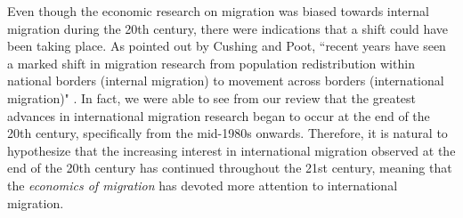 Even though the economic research on migration was biased towards internal migration during the 20th century, there were indications that a shift could have been taking place. As pointed out by Cushing and Poot, ``recent years have seen a marked shift in migration research from population redistribution within national borders (internal migration) to movement across borders (international migration)" \citep[p. 318]{cushing_crossing_2004}. In fact, we were able to see from our review that the greatest advances in international migration research began to occur at the end of the 20th century, specifically from the mid-1980s onwards. Therefore, it is natural to hypothesize that the increasing interest in international migration observed at the end of the 20th century has continued throughout the 21st century, meaning that the \textit{economics of migration} has devoted more attention to international migration.